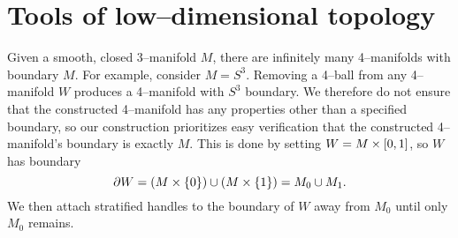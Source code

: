 \chapter{Tools of low--dimensional topology}
\label{chapter:problem}

Given a smooth, closed 3--manifold $M$, there are infinitely many 4--manifolds with boundary $M$.
For example, consider $M=S^3$.
Removing a 4--ball from any 4--manifold $W$ produces a 4--manifold with $S^3$ boundary.
We therefore do not ensure that the constructed 4--manifold has any properties other than a specified boundary, so our construction prioritizes easy verification that the constructed 4--manifold's boundary is exactly $M$.
This is done by setting $W=M\times [0,1]$, so $W$ has boundary 
\[
	\partial W = (M\times\{0\}) \cup (M\times\{1\}) = M_0 \cup M_1.
\]
We then attach stratified handles to the boundary of $W$ away from $M_0$ until only $M_0$ remains.








